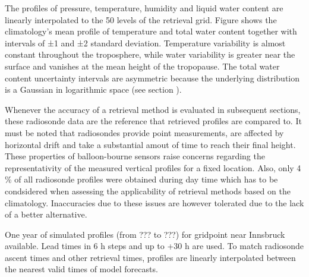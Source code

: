     The profiles of pressure, temperature, humidity and liquid water content
    are linearly interpolated to the 50 levels of the retrieval grid. Figure
     shows the climatology's mean profile of temperature and
    total water content together with intervals of ±1 and ±2 standard
    deviation. Temperature variability is almost constant throughout the
    troposphere, while water variability is greater near the surface and
    vanishes at the mean height of the tropopause. The total water content
    uncertainty intervals are asymmetric because the underlying distribution is
    a Gaussian in logarithmic space (see section \in[ch:statevector]).

    Whenever the accuracy of a retrieval method is evaluated in subsequent
    sections, these radiosonde data are the reference that retrieved profiles
    are compared to. It must be noted that radiosondes provide point
    measurements, are affected by horizontal drift and take a substantial amout
    of time to reach their final height. These properties of balloon-bourne
    sensors raise concerns regarding the representativity of the measured
    vertical profiles for a fixed location. Also, only 4 \% of all radiosonde
    profiles were obtained during day time which has to be condsidered when
    assessing the applicability of retrieval methods based on the climatology.
    Inaccuracies due to these issues are however tolerated due to the lack of
    a better alternative.

            {}

\stopsection


\startsection[title=COSMO7 Simulated Radiosoundings]

    One year of simulated profiles (from ??? to ???) for gridpoint near
    Innsbruck available. Lead times in 6 h steps and up to +30 h are used. To
    match radiosonde ascent times and other retrieval times, profiles are
    linearly interpolated between the nearest valid times of model forecasts.

